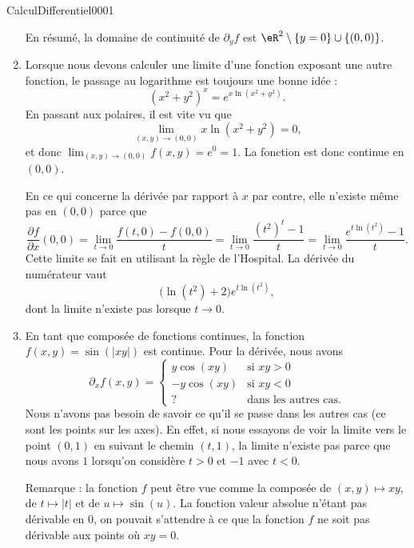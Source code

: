 \begin{corrige}{CalculDifferentiel0001}
\begin{enumerate}
			En résumé, la domaine de continuité de $\partial_yf$ est $\eR^2\setminus\{ y=0 \}\cup\{ (0,0) \}$.
			
			

		\item
			Lorsque nous devons calculer une limite d'une fonction exposant une autre fonction, le passage au logarithme est toujours une bonne idée : 
			\begin{equation}
				(x^2+y^2)^x= e^{x\ln(x^2+y^2)}.
			\end{equation}
			En passant aux polaires, il est vite vu que
			\begin{equation}
				\lim_{(x,y)\to(0,0)}x\ln(x^2+y^2)=0,
			\end{equation}
			et donc $\lim_{(x,y)\to(0,0)}f(x,y)=e^0=1$. La fonction est donc continue en $(0,0)$.

			En ce qui concerne la dérivée par rapport à $x$ par contre, elle n'existe même pas en $(0,0)$ parce que
			\begin{equation}
				\frac{ \partial f }{ \partial x }(0,0)=\lim_{t\to 0} \frac{ f(t,0)-f(0,0) }{ t }=\lim_{t\to 0} \frac{ (t^2)^t-1 }{ t }=\lim_{t\to 0} \frac{  e^{t\ln(t^2)}-1 }{ t }.
			\end{equation}
			Cette limite se fait en utilisant la règle de l'Hospital. La dérivée du numérateur vaut
			\begin{equation}
				\big( \ln(t^2)+2 \big) e^{t\ln(t^2)},
			\end{equation}
			dont la limite n'existe pas lorsque $t\to 0$.

		\item
			En tant que composée de fonctions continues, la fonction $f(x,y)=\sin(| xy |)$ est continue. Pour la dérivée, nous avons
			\begin{equation}
				\partial_xf(x,y)=
				\begin{cases}
					y\cos(xy)	&	\text{si }xy>0\\
					-y\cos(xy)	&	\text{si }xy<0\\
					?		&	\text{dans les autres cas}.
				\end{cases}
			\end{equation}
			Nous n'avons pas besoin de savoir ce qu'il se passe dans les autres cas (ce sont les points sur les axes). En effet, si nous essayons de voir la limite vers le point $(0,1)$ en suivant le chemin $(t,1)$, la limite n'existe pas parce que nous avons $1$ lorsqu'on considère $t>0$ et $-1$ avec $t<0$.

			Remarque : la fonction $f$ peut être vue comme la composée de $(x,y)\mapsto xy$, de $t\mapsto| t |$ et de $u\mapsto\sin(u)$. La fonction valeur absolue n'étant pas dérivable en $0$, on pouvait s'attendre à ce que la fonction $f$ ne soit pas dérivable aux points où $xy=0$.


\end{enumerate}
\end{corrige}
